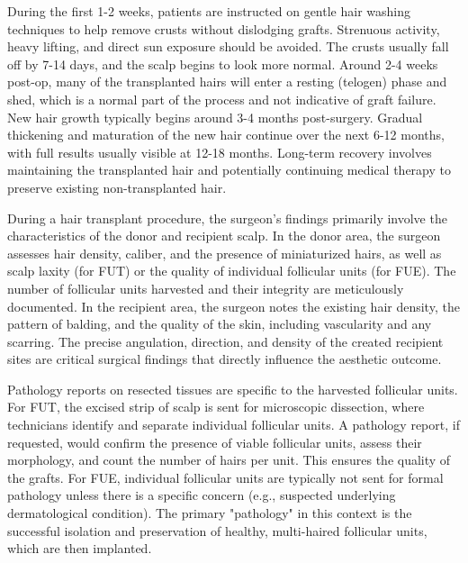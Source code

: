 During the first 1-2 weeks, patients are instructed on gentle hair washing techniques to help remove crusts without dislodging grafts. Strenuous activity, heavy lifting, and direct sun exposure should be avoided. The crusts usually fall off by 7-14 days, and the scalp begins to look more normal. Around 2-4 weeks post-op, many of the transplanted hairs will enter a resting (telogen) phase and shed, which is a normal part of the process and not indicative of graft failure. New hair growth typically begins around 3-4 months post-surgery. Gradual thickening and maturation of the new hair continue over the next 6-12 months, with full results usually visible at 12-18 months. Long-term recovery involves maintaining the transplanted hair and potentially continuing medical therapy to preserve existing non-transplanted hair.

During a hair transplant procedure, the surgeon's findings primarily involve the characteristics of the donor and recipient scalp. In the donor area, the surgeon assesses hair density, caliber, and the presence of miniaturized hairs, as well as scalp laxity (for FUT) or the quality of individual follicular units (for FUE). The number of follicular units harvested and their integrity are meticulously documented. In the recipient area, the surgeon notes the existing hair density, the pattern of balding, and the quality of the skin, including vascularity and any scarring. The precise angulation, direction, and density of the created recipient sites are critical surgical findings that directly influence the aesthetic outcome.

Pathology reports on resected tissues are specific to the harvested follicular units. For FUT, the excised strip of scalp is sent for microscopic dissection, where technicians identify and separate individual follicular units. A pathology report, if requested, would confirm the presence of viable follicular units, assess their morphology, and count the number of hairs per unit. This ensures the quality of the grafts. For FUE, individual follicular units are typically not sent for formal pathology unless there is a specific concern (e.g., suspected underlying dermatological condition). The primary "pathology" in this context is the successful isolation and preservation of healthy, multi-haired follicular units, which are then implanted.

